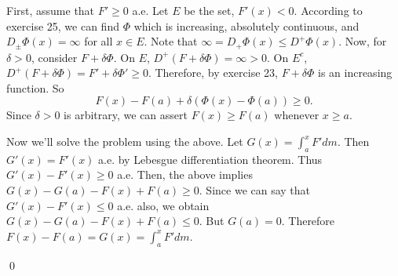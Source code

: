 \begin{problem}[3.5] \hfill
	
	First, assume that $F' \ge 0$ a.e.
	Let $E$ be the set, $F'(x) < 0$.
	According to exercise 25, we can find $\Phi$ which is increasing, absolutely continuous, and $D_{\pm}\Phi(x) = \infty$ for all $x \in E$.
	Note that $\infty = D_{+}\Phi(x) \le D^+\Phi(x)$.
	Now, for $\delta >0$, consider $F+\delta \Phi$.
	On $E$, $D^+(F+\delta \Phi) = \infty >0$.
	On $E^c$, $D^+(F+\delta \Phi) = F' + \delta \Phi' \ge 0$.
	Therefore, by exercise 23, $F+\delta \Phi$ is an increasing function.
	So
	\[
		F(x)-F(a) + \delta(\Phi(x) - \Phi(a)) \ge 0.
	\]
	Since $\delta>0$ is arbitrary, we can assert $F(x) \ge F(a)$ whenever $x \ge a$.

	Now we'll solve the problem using the above.
	Let $G(x) = \int_a^x F' dm$.
	Then $G'(x) = F'(x)$ a.e. by Lebesgue differentiation theorem.
	Thus $G'(x) - F'(x) \ge 0$ a.e.
	Then, the above implies $G(x) - G(a) - F(x) + F(a) \ge 0$.
	Since we can say that $G'(x) - F'(x) \le 0$ a.e. also,
	we obtain $G(x) - G(a) -F(x) + F(a) \le 0$.
	But $G(a) = 0$.
	Therefore $F(x) - F(a) = G(x) = \int_a^x F' dm$.

	\qed
\end{problem}

